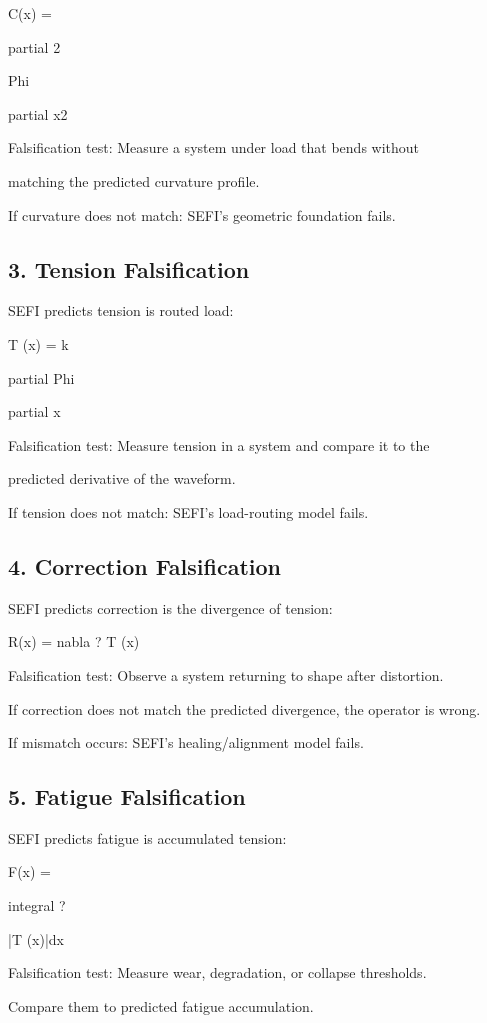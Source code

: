 \documentclass[10pt]{article}
\begin{document}
C(x) =

partial 2

Phi

partial x2

Falsification test: Measure a system under load that bends without

matching the predicted curvature profile.

If curvature does not match: SEFI's geometric foundation fails.

\subsection*{3. Tension Falsification}
SEFI predicts tension is routed load:

T (x) = k

partial Phi

partial x

Falsification test: Measure tension in a system and compare it to the

predicted derivative of the waveform.

If tension does not match: SEFI's load-routing model fails.

\subsection*{4. Correction Falsification}
SEFI predicts correction is the divergence of tension:

R(x) = nabla  ? T (x)

Falsification test: Observe a system returning to shape after distortion.

If correction does not match the predicted divergence, the operator is wrong.

If mismatch occurs: SEFI's healing/alignment model fails.


\subsection*{5. Fatigue Falsification}
SEFI predicts fatigue is accumulated tension:

F(x) =

integral ?

|T (x)|dx

Falsification test: Measure wear, degradation, or collapse thresholds.

Compare them to predicted fatigue accumulation.
\end{document}
